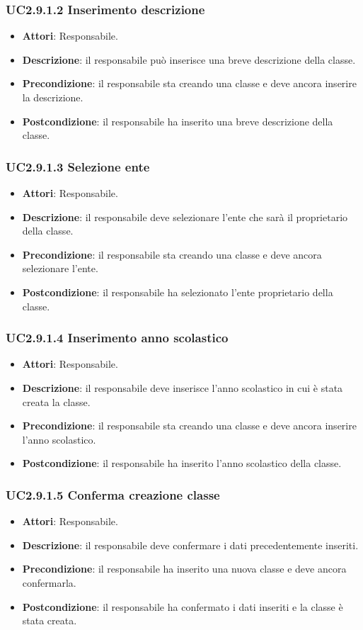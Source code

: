 \subsubsection{UC2.9.1.2 Inserimento descrizione}
\begin{itemize}
\item \textbf{Attori}: Responsabile.
\item \textbf{Descrizione}: il responsabile può inserisce una breve descrizione della classe.
\item \textbf{Precondizione}: il responsabile sta creando una classe e deve ancora inserire la descrizione.
\item \textbf{Postcondizione}: il responsabile ha inserito una breve descrizione della classe.
\end{itemize}
\subsubsection{UC2.9.1.3 Selezione ente}
\begin{itemize}
\item \textbf{Attori}: Responsabile.
\item \textbf{Descrizione}: il responsabile deve selezionare l'ente che sarà il proprietario della classe.
\item \textbf{Precondizione}: il responsabile sta creando una classe e deve ancora selezionare l'ente.
\item \textbf{Postcondizione}: il responsabile ha selezionato l'ente proprietario della classe.
\end{itemize}
\subsubsection{UC2.9.1.4 Inserimento anno scolastico}
\begin{itemize}
\item \textbf{Attori}: Responsabile.
\item \textbf{Descrizione}: il responsabile deve inserisce l'anno scolastico in cui è stata creata la classe.
\item \textbf{Precondizione}: il responsabile sta creando una classe e deve ancora inserire l'anno scolastico.
\item \textbf{Postcondizione}: il responsabile ha inserito l'anno scolastico della classe.
\end{itemize}
\subsubsection{UC2.9.1.5 Conferma creazione classe}
\begin{itemize}
\item \textbf{Attori}: Responsabile.
\item \textbf{Descrizione}: il responsabile deve confermare i dati precedentemente inseriti.
\item \textbf{Precondizione}: il responsabile ha inserito una nuova classe e deve ancora confermarla.
\item \textbf{Postcondizione}: il responsabile ha confermato i dati inseriti e la classe è stata creata.
\end{itemize}
